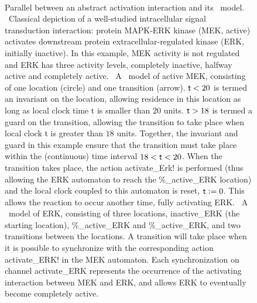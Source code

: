 \begin{figure}[!hb]
\begin{center}
\ \
\end{center}
\caption{Parallel between an abstract activation interaction and its \tas\ model.
{\bf \protect\subref{subfig:mek-erk}}~Classical depiction of a well-studied intracellular signal transduction interaction: protein
MAPK-ERK kinase (MEK, active) activates downstream protein extracellular-regulated kinase (ERK, initially inactive).
In this example, MEK activity is not regulated and ERK has three activity levels,
completely inactive, halfway active and completely active.
{\bf \protect{}}~A \ta\ model of active MEK, consisting of one location (circle) and one
transition (arrow). ${\sf t} < 20$ is termed an invariant on the location, allowing residence in this location as long as local
clock time {\sf t} is smaller than $20$ units. ${\sf t} > 18$ is termed a guard on the transition, allowing the
transition to take place when local clock {\sf t} is greater than $18$ units. Together, the invariant and guard in this
example ensure that the transition must take place within the (continuous) time interval $18 < {\sf t} < 20$. When the
transition takes place, the action {\sf activate\_Erk!} is performed (thus allowing the ERK automaton to reach the {\sf
50\%\_active\_ERK} location) and the local clock coupled to this automaton is reset, ${\sf t} := 0$.
This allows the reaction to occur another time, fully activating ERK.
{\bf \protect\subref{subfig:erk}}~A \ta\ model of ERK, consisting of three locations, {\sf inactive\_ERK}
(the starting location), {\sf 50\%\_active\_ERK} and {\sf 100\%\_active\_ERK},
and two transitions between the locations. A transition will take place when it is possible to synchronize with
the corresponding action {\sf activate\_ERK!} in the MEK automaton.
Each synchronization on channel {\sf activate\_ERK} represents the occurrence of the activating
interaction between MEK and ERK, and allows ERK to eventually become completely active.}\label{fig:abstraction-mek-erk}
\end{figure}





